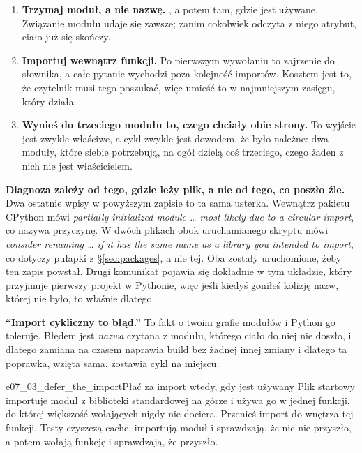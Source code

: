 \begin{enumerate}[leftmargin=1.6em, itemsep=3pt]
  \item \textbf{Trzymaj moduł, a nie nazwę.} , a potem
         tam, gdzie jest używane. Związanie modułu udaje się
        zawsze; zanim cokolwiek odczyta z niego atrybut, ciało już się
        skończy.
  \item \textbf{Importuj wewnątrz funkcji.} Po pierwszym wywołaniu to
        zajrzenie do słownika, a całe pytanie wychodzi poza kolejność
        importów. Kosztem jest to, że czytelnik musi tego poszukać, więc
        umieść to w najmniejszym zasięgu, który działa.
  \item \textbf{Wynieś do trzeciego modułu to, czego chciały obie strony.}
        To wyjście jest zwykle właściwe, a cykl zwykle jest dowodem, że było
        należne: dwa moduły, które siebie potrzebują, na ogół dzielą coś
        trzeciego, czego żaden z nich nie jest właścicielem.
\end{enumerate}

\begin{warning}
\textbf{Diagnoza zależy od tego, gdzie leży plik, a nie od tego, co poszło
źle.} Dwa ostatnie wpisy w powyższym zapisie to ta sama usterka. Wewnątrz
pakietu CPython mówi \emph{partially initialized module \dots{} most likely
due to a circular import}, co nazywa przyczynę. W dwóch plikach obok
uruchamianego skryptu mówi \emph{consider renaming \dots{} if it has the
same name as a library you intended to import}, co dotyczy pułapki z
\S\ref{sec:packages}, a nie tej. Oba zostały uruchomione, żeby ten zapis
powstał. Drugi komunikat pojawia się dokładnie w tym układzie, który
przyjmuje pierwszy projekt w Pythonie, więc jeśli kiedyś goniłeś kolizję
nazw, której nie było, to właśnie dlatego.
\end{warning}

\begin{trapbox}
\textbf{\enquote{Import cykliczny to błąd.}} To fakt o twoim grafie modułów
i Python go toleruje. Błędem jest \emph{nazwa} czytana z modułu, którego
ciało do niej nie doszło, i dlatego zamiana  na
 czasem naprawia build bez żadnej innej zmiany \dash{} i
dlatego ta poprawka, wzięta sama, zostawia cykl na miejscu.
\end{trapbox}

\begin{exercise}{e07_03_defer_the_import}{Płać za import wtedy, gdy jest używany}
Plik startowy importuje moduł z biblioteki standardowej na górze i używa go
w jednej funkcji, do której większość wołających nigdy nie dociera. Przenieś
import do wnętrza tej funkcji. Testy czyszczą cache, importują moduł i
sprawdzają, że nic nie przyszło, a potem wołają funkcję i sprawdzają, że
przyszło.
\end{exercise}

